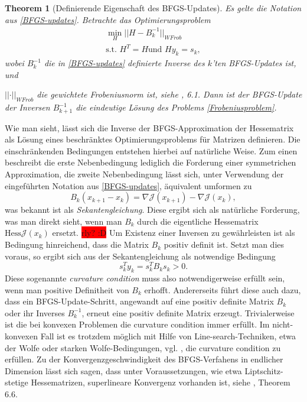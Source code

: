 \documentclass[bibliography=totoc,12pt,a4paper]{scrartcl}
\theoremstyle{exampstyle}
\newtheorem{theorem}[defi]{Theorem}
\numberwithin{equation}{section}
\begin{document}
\begin{theorem}[Definierende Eigenschaft des BFGS-Updates]
		
	Es gelte die Notation aus \ref{BFGS-updates}. Betrachte das Optimierungsproblem
	\begin{equation}\label{Frobeniusproblem}
	\begin{aligned}
		\underset{H}{\min} \vert\vert H - B_k^{-1} \vert\vert _{WFrob} \\
		\text{s.t. } H^T = H \text{und } H y_k = s_k,
	\end{aligned}
	\end{equation}
	wobei $B_k^{-1}$ die in \ref{BFGS-updates} definierte Inverse des $k$'ten BFGS-Updates ist, und 

$\vert\vert \cdot \vert\vert_{WFrob}$ die gewichtete Frobeniusnorm ist, siehe \cite{Nocedal}, 6.1. Dann ist der BFGS-Update der Inversen $B_{k+1}^{-1}$ die eindeutige Lösung des Problems \ref{Frobeniusproblem}.
\end{theorem}
Wie man sieht, lässt sich die Inverse der BFGS-Approximation der Hessematrix als Lösung eines beschränktes Optimierungsproblems für Matrizen definieren. Die einschränkenden Bedingungen entstehen hierbei auf natürliche Weise. Zum einen beschreibt die erste Nebenbedingung lediglich die Forderung einer symmetrichen Approximation, die zweite Nebenbedingung lässt sich, unter Verwendung der eingeführten Notation aus \ref{BFGS-updates}, äquivalent umformen zu
\begin{equation}
	B_k (x_{k+1} - x_k) = \nabla \mathcal{J}(x_{k+1}) - \nabla \mathcal{J}(x_k),
\end{equation}
was bekannt ist als \textit{Sekantengleichung}. Diese ergibt sich als natürliche Forderung, was man direkt sieht, wenn man $B_k$ durch die eigentliche Hessematrix $\text{Hess}\mathcal{J}(x_k)$ ersetzt. \colorbox{red}{rly? :D} Um Existenz einer Inversen zu gewährleisten ist als Bedingung hinreichend, dass die Matrix $B_k$ positiv definit ist. Setzt man dies voraus, so ergibt sich aus der Sekantengleichung als notwendige Bedingung
\begin{equation}
	s_k^T y_k = s_k^T B_k s_k > 0.
\end{equation}
Diese sogenannte \textit{curvature condition} muss also notwendigerweise erfüllt sein, wenn man positive Definitheit von $B_k$ erhofft. Andererseits führt diese auch dazu, dass ein BFGS-Update-Schritt, angewandt auf eine positiv definite Matrix $B_k$ oder ihr Inverses $B_k^{-1}$, erneut eine positiv definite Matrix erzeugt. Trivialerweise ist die bei konvexen Problemen die curvature condition immer erfüllt. Im nicht-konvexen Fall ist es trotzdem möglich mit Hilfe von Line-search-Techniken, etwa der Wolfe oder starken Wolfe-Bedingungen, vgl. \cite{Nocedal}, die curvature condition zu erfüllen. Zu der Konvergenzgeschwindigkeit des BFGS-Verfahens in endlicher Dimension lässt sich sagen, dass unter Voraussetzungen, wie etwa Liptschitz-stetige Hessematrizen, superlineare Konvergenz vorhanden ist, siehe \cite{Nocedal}, Theorem 6.6.
\end{document}
